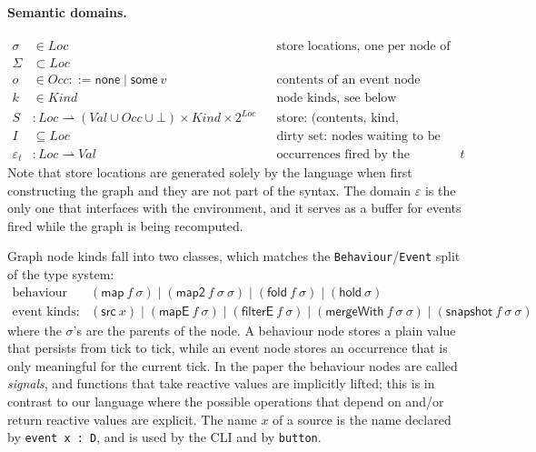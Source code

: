 \documentclass{article}
\newcommand{\kw}[1]{\mathsf{#1}}
\newcommand{\none}{\kw{none}}
\newcommand{\some}[1]{\kw{some}\ #1}
\begin{document}
\paragraph{Semantic domains.}
\begin{align*}
\sigma &\in \mathit{Loc} && \text{store locations, one per node of the graph}\\
  \Sigma & \subset \mathit{Loc} &&\\
o &\in \mathit{Occ} ::= \none \mid \some{v} && \text{contents of an event node}\\
k &\in \mathit{Kind} && \text{node kinds, see below}\\
S &: \mathit{Loc} \rightharpoonup (\mathit{Val} \cup \mathit{Occ} \cup \bot) \times \mathit{Kind} \times 2^{\mathit{Loc}} && \text{store: (contents, kind, dependents)}\\
I &\subseteq \mathit{Loc} && \text{dirty set: nodes waiting to be recomputed}\\
\varepsilon_t &: \mathit{Loc} \rightharpoonup \mathit{Val} && \text{occurrences fired by the environment at tick } t
\end{align*}
Note that store locations are generated solely by the language when first constructing the graph and they are not part of the syntax. The domain $ \varepsilon $ is the only one that interfaces with the environment, and it serves as a buffer for events fired while the graph is being recomputed.

Graph node kinds fall into two classes, which matches the \texttt{Behaviour}/\texttt{Event} split of the type system:
\begin{align*}
\text{behaviour kinds:}\quad & (\kw{map}\ f\ \sigma) \mid (\kw{map2}\ f\ \sigma\ \sigma) \mid (\kw{fold}\ f\ \sigma) \mid (\kw{hold}\ \sigma)\\
\text{event kinds:}\quad & (\kw{src}\ x) \mid (\kw{mapE}\ f\ \sigma) \mid (\kw{filterE}\ f\ \sigma) \mid (\kw{mergeWith}\ f\ \sigma\ \sigma) \mid (\kw{snapshot}\ f\ \sigma\ \sigma)
\end{align*}
where the $\sigma$'s are the parents of the node. A behaviour node stores a plain value that persists from tick to tick, while an event node stores an occurrence that is only meaningful for the current tick. In the paper \cite{10.1007/11693024_20} the behaviour nodes are called \textit{signals}, and functions that take reactive values are implicitly lifted; this is in contrast to our language where the possible operations that depend on and/or return reactive values are explicit. The name $x$ of a source is the name declared by \texttt{event x : D}, and is used by the CLI and by \texttt{button}. 
\end{document}
